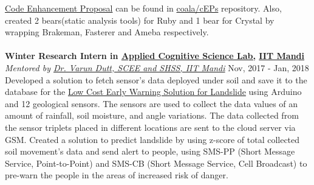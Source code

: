 \documentclass[margin, centered]{res}
\begin{document}
\begin{resume}
    \href{https://github.com/coala/cEPs/blob/master/cEP-0027.md}{Code Enhancement Proposal} can be found
    in \href{https://github.com/coala/cEPs}{coala/cEPs} repository. Also, created 2 bears(static analysis tools)
    for Ruby and 1 bear for Crystal by wrapping Brakeman, Fasterer and Ameba respectively. \\
    \\
    \textbf{Winter Research Intern in \href{http://acslab.org}{Applied Cognitive Science Lab,} \href{https://iitmandi.ac.in/}{IIT Mandi}} \\
    \emph{Mentored by \href{https://faculty.iitmandi.ac.in/~varun/}{Dr. Varun Dutt, SCEE and SHSS, IIT Mandi}} \hfill Nov, 2017 - Jan, 2018 \\
    Developed a solution to fetch sensor’s data deployed under soil and save it to the database for the
    \href{http://landslidemonitoring.esy.es/}{Low Cost Early Warning Solution for Landslide} using Arduino
    and 12 geological sensors. The sensors are used to collect the data values of an amount of rainfall,
    soil moisture, and angle variations. The data collected from the sensor triplets placed in different
    locations are sent to the cloud server via GSM. Created a solution to predict landslide by using z-score
    of total collected soil movement’s data and send alert to people, using SMS-PP (Short Message Service,
    Point-to-Point) and SMS-CB (Short Message Service, Cell Broadcast) to pre-warn the people in the areas
    of increased risk of danger.



\end{resume}
\end{document}
